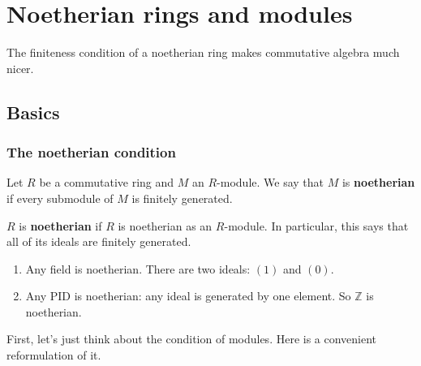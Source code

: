 \chapter{Noetherian rings and modules}
\newcommand{\supp}{\mathrm{supp}}

The finiteness condition of a noetherian ring makes commutative algebra much
nicer.

\section{Basics}

\subsection{The noetherian condition}
\begin{definition} 
Let $R$ be a commutative ring and $M$ an $R$-module. We say that $M$ is
\textbf{noetherian} if every submodule of $M$ is finitely generated.
\end{definition} 

\begin{definition} 
$R$ is \textbf{noetherian} if $R$ is noetherian as an $R$-module. In
particular, this says that all of its ideals are finitely generated.
\end{definition} 

\begin{example} 
\begin{enumerate}
\item Any field is noetherian. There are two ideals: $(1)$ and $(0)$. 
\item Any PID is noetherian: any ideal is generated by one element. So
$\mathbb{Z}$ is noetherian.
\end{enumerate}
\end{example} 

First, let's just think about the condition of modules. Here is a convenient
reformulation of it.

